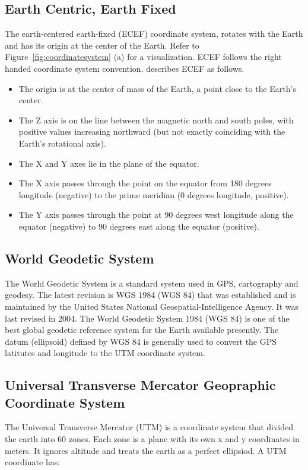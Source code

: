 \subsection{Earth Centric, Earth Fixed}

The earth-centered earth-fixed (ECEF) coordinate system, rotates with the Earth and has its origin at the center of the Earth. Refer to Figure~\ref{fig:coordinatesystem} (a) for a visualization. ECEF follows the right handed coordinate system convention.  describes ECEF as follows.

\begin{itemize}
	\item The origin is at the center of mass of the Earth, a point close to the Earth's center.
	\item The Z axis is on the line between the magnetic north and south poles, with positive values increasing northward (but not exactly coinciding with the Earth's rotational axis).
	\item The X and Y axes lie in the plane of the equator.
	\item The X axis passes through the point on the equator from 180 degrees longitude (negative) to the prime meridian (0 degrees longitude, positive).
	\item The Y axis passes through the point at 90 degrees west longitude along the equator (negative) to 90 degrees east along the equator (positive).
\end{itemize}

\subsection{World Geodetic System}
The World Geodetic System is a standard system used in GPS, cartography and geodesy. The latest revision is WGS 1984 (WGS 84) that was established and is maintained by the United States National Geospatial-Intelligence Agency. It was last revised in 2004. The World Geodetic System 1984 (WGS 84) is one of the best global geodetic reference system for the Earth available presently. The datum (ellipsoid) defined by WGS 84 is generally used to convert the GPS latitutes and longitude to the UTM coordinate system.

\subsection{Universal Transverse Mercator Geopraphic Coordinate System}
The Universal Transverse Mercator (UTM) is a coordinate system that divided the earth into 60 zones. Each zone is a plane with its own x and y coordinates in meters. It ignores altitude and treats the earth as a perfect ellipsiod. A UTM coordinate has:

